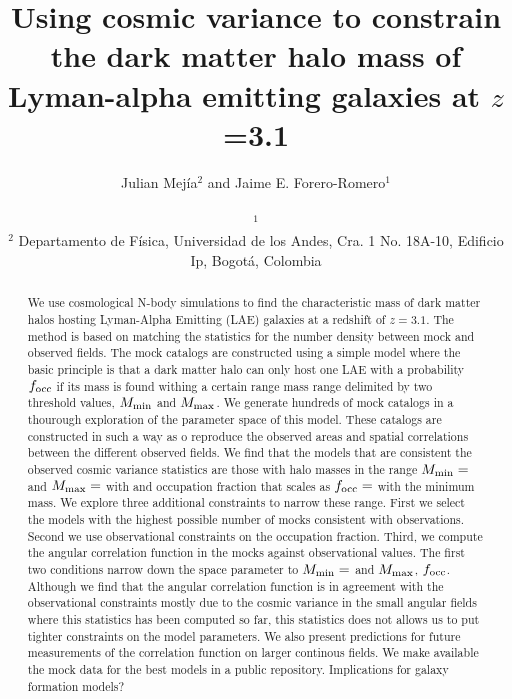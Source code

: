 \documentclass[usenatbib]{mn2e}
\begin{document}
\title[Dark Matter Halo Mass for LAEs  at $z=3.1$]{Using cosmic
  variance to constrain the dark matter halo mass of Lyman-alpha emitting galaxies at $z$=3.1}
  
\author[~J.~E. Forero-Romero and J. Mejia]{
\parbox[t]{\textwidth}{\raggedright 
  Julian Mej\'ia$^{2}$ and
Jaime E. Forero-Romero$^{1}$}
\vspace*{6pt}\\
$^{1}$\\
$^{2}$ Departamento de F\'{i}sica, Universidad de los Andes, Cra. 1
No. 18A-10, Edificio Ip, Bogot\'a, Colombia 
}

\maketitle

\begin{abstract}
We use cosmological N-body simulations to find the characteristic mass
of dark matter halos hosting Lyman-Alpha Emitting (LAE) galaxies at a
redshift of $z=3.1$. The method is based on matching the statistics
for the number density between mock and observed fields. The mock
catalogs are constructed using a simple model where the basic
principle is that a dark matter halo can only host one LAE with a
probability $f_{\rm occ}$ if its mass is found withing a certain range
mass range delimited by two threshold values, $M_{\rm min}$ and $M_{\rm max}$. We generate
hundreds of mock catalogs in a thourough exploration of the parameter
space of this model. These catalogs are constructed in such a way as o
reproduce the observed areas and spatial correlations between the
different observed fields. We find that the models that are consistent
the observed cosmic variance statistics are those with halo masses in
the range $M_{\rm  min}=$ and $M_{\rm max}=$ with and occupation
fraction that scales as $f_{\rm occ}=$ with the minimum mass. We
explore three additional constraints to narrow these range. First we
select the models with the highest possible number of mocks consistent
with observations. Second we use observational constraints on the
occupation fraction. Third, we compute the angular correlation
function in the mocks against observational values. The first two
conditions narrow down the space parameter to $M_{\rm min}=$ and
$M_{\rm max}$, $f_{\rm occ}$. Although we find that the angular
correlation function is in agreement with the observational
constraints mostly due to the cosmic variance in the small angular
fields where this statistics has been computed so far, this statistics
does not allows us to put tighter constraints on the model
parameters. We also present predictions for future measurements of the
correlation function on larger continous fields. We make available the
mock data for the best models in a public repository. Implications for
galaxy formation models? 
\end{abstract}
\end{document}
